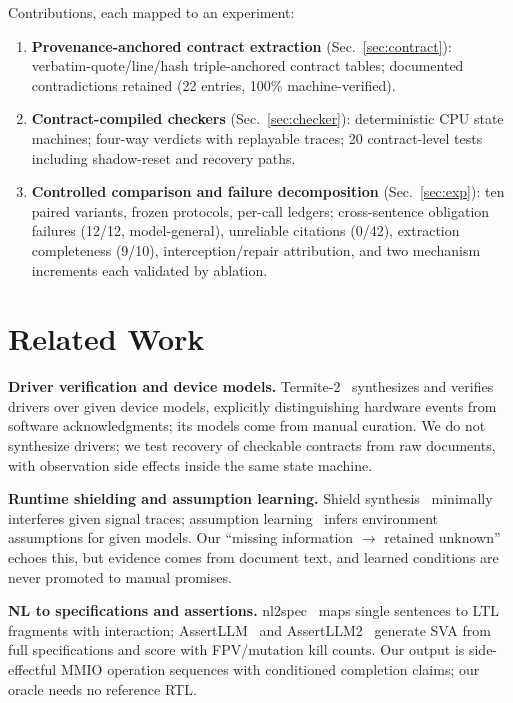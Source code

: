 \documentclass[conference]{IEEEtran}
\begin{document}
Contributions, each mapped to an experiment:
\begin{enumerate}
\item \textbf{Provenance-anchored contract extraction}
      (Sec.~\ref{sec:contract}): verbatim-quote/line/hash triple-anchored
      contract tables; documented contradictions retained (22 entries,
      100\% machine-verified).
\item \textbf{Contract-compiled checkers} (Sec.~\ref{sec:checker}):
      deterministic CPU state machines; four-way verdicts with replayable
      traces; 20 contract-level tests including shadow-reset and recovery
      paths.
\item \textbf{Controlled comparison and failure decomposition}
      (Sec.~\ref{sec:exp}): ten paired variants, frozen protocols,
      per-call ledgers; cross-sentence obligation failures (12/12,
      model-general), unreliable citations (0/42), extraction
      completeness (9/10), interception/repair attribution, and two
      mechanism increments each validated by ablation.
\end{enumerate}

\section{Related Work}
\textbf{Driver verification and device models.} Termite-2~\cite{termite2}
synthesizes and verifies drivers over given device models, explicitly
distinguishing hardware events from software acknowledgments; its models
come from manual curation. We do not synthesize drivers; we test recovery
of checkable contracts from raw documents, with observation side effects
inside the same state machine.

\textbf{Runtime shielding and assumption learning.} Shield
synthesis~\cite{shield} minimally interferes given signal traces;
assumption learning~\cite{assume} infers environment assumptions for
given models. Our ``missing information $\rightarrow$ retained unknown''
echoes this, but evidence comes from document text, and learned
conditions are never promoted to manual promises.

\textbf{NL to specifications and assertions.} nl2spec~\cite{nl2spec}
maps single sentences to LTL fragments with interaction;
AssertLLM~\cite{assertllm} and AssertLLM2~\cite{assertllm2} generate SVA
from full specifications and score with FPV/mutation kill counts. Our
output is side-effectful MMIO operation sequences with conditioned
completion claims; our oracle needs no reference RTL.
\end{document}
